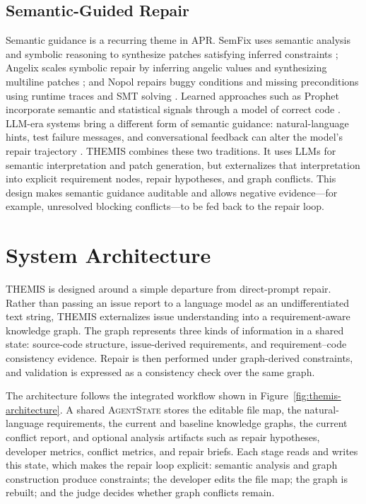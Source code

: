 \documentclass[11pt]{article}
\begin{document}
\subsection{Semantic-Guided Repair}
\label{subsec:semantic-guided-repair}

Semantic guidance is a recurring theme in APR.  SemFix uses semantic analysis and symbolic reasoning to synthesize patches satisfying inferred constraints \citep{nguyen-etal-2013-semfix}; Angelix scales symbolic repair by inferring angelic values and synthesizing multiline patches \citep{mechtaev-etal-2016-angelix}; and Nopol repairs buggy conditions and missing preconditions using runtime traces and SMT solving \citep{xuan-etal-2017-nopol}.  Learned approaches such as Prophet incorporate semantic and statistical signals through a model of correct code \citep{long-rinard-2016-prophet}.  LLM-era systems bring a different form of semantic guidance: natural-language hints, test failure messages, and conversational feedback can alter the model's repair trajectory \citep{sobania-etal-2023-chatgpt-bugfixing,xia-etal-2024-chatrepair}.  THEMIS combines these two traditions.  It uses LLMs for semantic interpretation and patch generation, but externalizes that interpretation into explicit requirement nodes, repair hypotheses, and graph conflicts.  This design makes semantic guidance auditable and allows negative evidence---for example, unresolved blocking conflicts---to be fed back to the repair loop.

\section{System Architecture}
\label{sec:system-architecture}

THEMIS is designed around a simple departure from direct-prompt repair.  Rather than passing an issue report to a language model as an undifferentiated text string, THEMIS externalizes issue understanding into a requirement-aware knowledge graph.  The graph represents three kinds of information in a shared state: source-code structure, issue-derived requirements, and requirement--code consistency evidence.  Repair is then performed under graph-derived constraints, and validation is expressed as a consistency check over the same graph.

The architecture follows the integrated workflow shown in Figure~\ref{fig:themis-architecture}.  A shared \textsc{AgentState} stores the editable file map, the natural-language requirements, the current and baseline knowledge graphs, the current conflict report, and optional analysis artifacts such as repair hypotheses, developer metrics, conflict metrics, and repair briefs.  Each stage reads and writes this state, which makes the repair loop explicit: semantic analysis and graph construction produce constraints; the developer edits the file map; the graph is rebuilt; and the judge decides whether graph conflicts remain.
\end{document}
